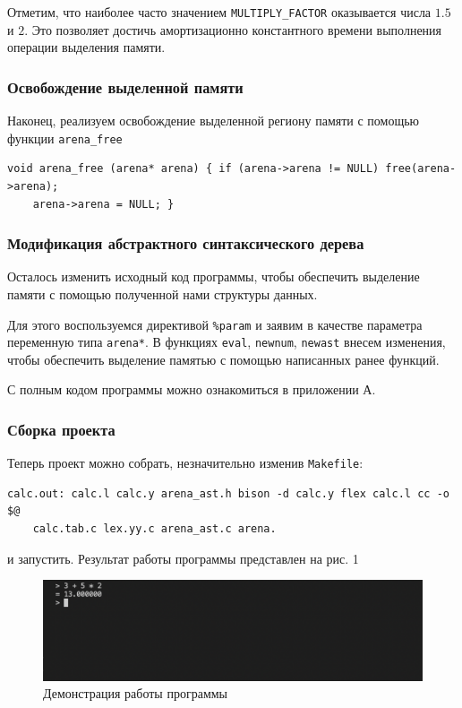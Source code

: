 \documentclass[bachelor, och, otchet]{SCWorks}
\begin{document}
Отметим, что наиболее часто значением \verb|MULTIPLY_FACTOR| оказывается числа
$1.5$ и $2$. Это позволяет достичь амортизационно константного времени
выполнения операции выделения памяти\cite{FacebookDoc}.

\subsubsection{Освобождение выделенной памяти}
Наконец, реализуем освобождение выделенной региону памяти с помощью функции
\verb|arena_free|

\begin{verbatim}
void arena_free (arena* arena) { if (arena->arena != NULL) free(arena->arena);
    arena->arena = NULL; }
\end{verbatim}

\subsubsection{Модификация абстрактного синтаксического дерева}
Осталось изменить исходный код программы, чтобы обеспечить выделение памяти с
помощью полученной нами структуры данных.

Для этого воспользуемся директивой \verb|%param| и заявим в качестве параметра
переменную типа \verb|arena*|. В функциях \verb|eval|, \verb|newnum|,
\verb|newast| внесем изменения, чтобы обеспечить выделение памятью с помощью
написанных ранее
функций.

С полным кодом программы можно ознакомиться в приложении А.

\subsubsection{Сборка проекта}
Теперь проект можно собрать, незначительно изменив \verb|Makefile|:

\begin{verbatim}
calc.out: calc.l calc.y arena_ast.h bison -d calc.y flex calc.l cc -o $@
    calc.tab.c lex.yy.c arena_ast.c arena.
\end{verbatim}
и запустить. Результат работы программы представлен на рис. 1

\begin{figure}[hbt!]
    \centering
    \includegraphics[scale=0.5]{naivetest.png}
    \caption{Демонстрация работы программы}
    \label{fig:naivetest}
\end{figure}
\end{document}
